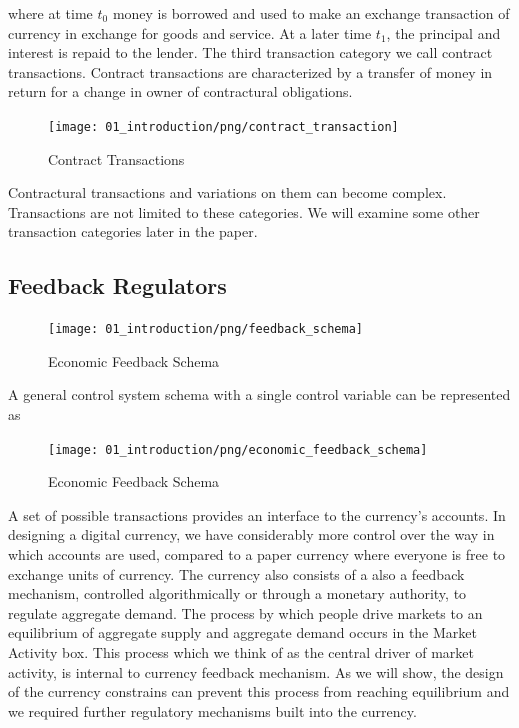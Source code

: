 where at time $t_0$ money is borrowed and used to make an exchange transaction of currency in
exchange for goods and service. At a later time $t_1$, the principal and interest is repaid to the
lender. The third transaction category we call contract transactions. Contract transactions are
characterized by a transfer of money in return for a change in owner of contractural obligations.

\begin{figure}[H]
\centering
\texttt{[image: 01\_introduction/png/contract\_transaction]}
\caption{Contract Transactions}
\label{fig:contract_transaction1}
\end{figure}

Contractural transactions and variations on them can become complex. Transactions are not limited to
these categories. We will examine some other transaction categories later in the paper.

\subsection{Feedback Regulators}

\begin{figure}[H]
\centering
\texttt{[image: 01\_introduction/png/feedback\_schema]}
\caption{Economic Feedback Schema}
\label{fig:feedback_schema1}
\end{figure}

A general control system schema with a single control variable can be represented as

\begin{figure}[H]
\centering
\texttt{[image: 01\_introduction/png/economic\_feedback\_schema]}
\caption{Economic Feedback Schema}
\label{fig:economic_feedback_schema1}
\end{figure}

A set of possible transactions provides an interface to the currency's accounts. In designing a
digital currency, we have considerably more control over the way in which accounts are used,
compared to a paper currency where everyone is free to exchange units of currency. The currency also
consists of a 
also a feedback mechanism, controlled algorithmically or through a monetary authority, to regulate
aggregate demand. The process by which people drive markets to an equilibrium of aggregate supply
and aggregate demand occurs in the Market Activity box. This process which we think of as the
central driver of market activity, is internal to currency feedback mechanism. As we will show, the
design of the currency constrains can prevent this process from reaching equilibrium and we
required further regulatory mechanisms built into the currency.

